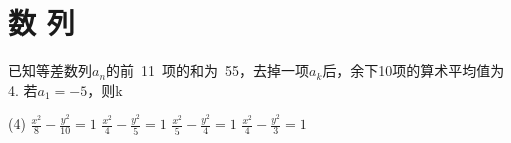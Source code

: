 \chapter{数 列}
已知等差数列${a_n}$的前~11~项的和为~55，去掉一项$a_k$后，余下10项的算术平均值为4. 若$a_1=-5$，则k\underline{\qquad}
\begin{tasks}(4)
	\task $\frac{x^2}{8}-\frac{y^2}{10}=1$ \task $\frac{x^2}{4}-\frac{y^2}{5}=1$ \task $\frac{x^2}{5}-\frac{y^2}{4}=1$ \task $\frac{x^2}{4}-\frac{y^2}{3}=1$ 
\end{tasks}

